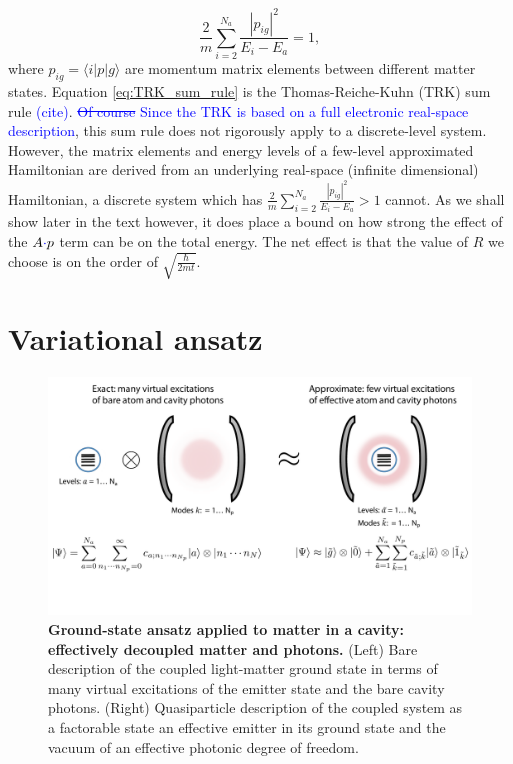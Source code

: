 \documentclass[aps,prb,twocolumn,
	groupedaddress,superscriptaddress,
	amsfonts,amssymb,amsmath,floatfix,
	citeautoscript]{revtex4-1}
\newcommand{\Jadd}[1]{\textcolor{blue}{#1}}
\newcommand{\Jrem}[1]{\textcolor{blue}{\sout{#1}}}
\begin{document}
\begin{equation}\label{eq:TRK_sum_rule}
\frac{2}{m}\sum\limits_{i=2}^{N_a}\frac{|p_{ig}|^2}{E_i - E_a} = 1,
\end{equation}
where $p_{ig} = \langle i|p|g\rangle$ are momentum matrix elements between different matter states. Equation \ref{eq:TRK_sum_rule} is the Thomas-Reiche-Kuhn (TRK) sum rule \Jadd{(cite)}. \Jrem{Of course} \Jadd{Since the TRK is based on a full electronic real-space description}, this sum rule does not rigorously apply to a discrete-level system. However, the matrix elements and energy levels of a few-level approximated Hamiltonian  are derived from an underlying real-space (infinite dimensional) Hamiltonian, a discrete system which has  $\frac{2}{m}\sum\limits_{i=2}^{N_a}\frac{|p_{ig}|^2}{E_i - E_a} > 1$ cannot. As we shall show later in the text however, it does place a bound on how strong the effect of the $A\Jadd{\cdot}p$ term can be on the total energy. The net effect is that the value of $R$ we choose is on the order of $\sqrt{\frac{\hbar}{2mt}}$.

\section{Variational ansatz}
\label{sec:variational_ansatz}
\begin{figure}[t]
\includegraphics[width=16cm]{conceptfigure.pdf}
\caption{\textbf{Ground-state ansatz applied to matter in a cavity: effectively decoupled matter and photons.} (Left) Bare description of the coupled light-matter ground state in terms of many virtual excitations of the emitter state and the bare cavity photons. (Right) Quasiparticle description of the coupled system as a factorable state an effective emitter in its ground state and the vacuum of an effective photonic degree of freedom.}
\label{fig:ansatz}
\end{figure}
\end{document}
